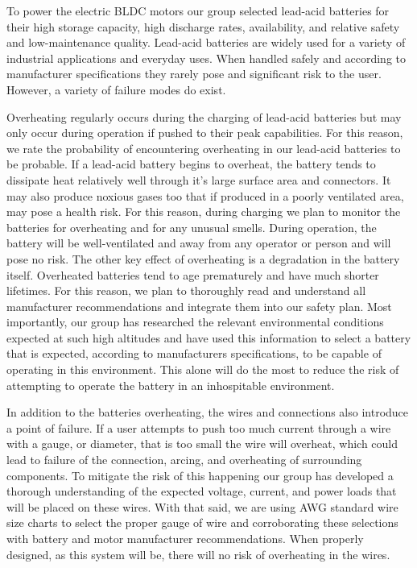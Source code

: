 To power the electric BLDC motors our group selected lead-acid batteries for their high storage capacity, high discharge rates, availability, and relative safety and low-maintenance quality. Lead-acid batteries are widely used for a variety of industrial applications and everyday uses. When handled safely and according to manufacturer specifications they rarely pose and significant risk to the user. However, a variety of failure modes do exist. 

Overheating regularly occurs during the charging of lead-acid batteries but may only occur during operation if pushed to their peak capabilities. For this reason, we rate the probability of encountering overheating in our lead-acid batteries to be probable. If a lead-acid battery begins to overheat, the battery tends to dissipate heat relatively well through it's large surface area and connectors. It may also produce noxious gases too that if produced in a poorly ventilated area, may pose a health risk. For this reason, during charging we plan to monitor the batteries for overheating and for any unusual smells. During operation, the battery will be well-ventilated and away from any operator or person and will pose no risk. The other key effect of overheating is a degradation in the battery itself. Overheated batteries tend to age prematurely and have much shorter lifetimes. For this reason, we plan to thoroughly read and understand all manufacturer recommendations and integrate them into our safety plan. Most importantly, our group has researched the relevant environmental conditions expected at such high altitudes and have used this information to select a battery that is expected, according to manufacturers specifications, to be capable of operating in this environment. This alone will do the most to reduce the risk of attempting to operate the battery in an inhospitable environment. 

In addition to the batteries overheating, the wires and connections also introduce a point of failure. If a user attempts to push too much current through a wire with a gauge, or diameter, that is too small the wire will overheat, which could lead to failure of the connection, arcing, and overheating of surrounding components. To mitigate the risk of this happening our group has developed a thorough understanding of the expected voltage, current, and power loads that will be placed on these wires. With that said, we are using AWG standard wire size charts to select the proper gauge of wire and corroborating these selections with battery and motor manufacturer recommendations. When properly designed, as this system will be, there will no risk of overheating in the wires. 

